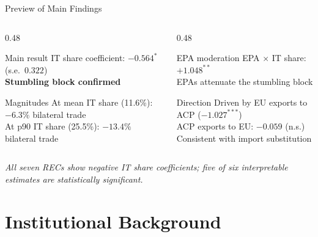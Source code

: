 \documentclass[aspectratio=169,11pt]{beamer}
\begin{document}
\begin{frame}{Preview of Main Findings}

    \begin{columns}[T]
        \begin{column}{0.48\textwidth}
            \begin{block}{Main result}
                IT share coefficient: \alert{$-0.564^{*}$} (s.e.\ $0.322$)\\[2pt]
                \textbf{Stumbling block confirmed}
            \end{block}
            \medskip
            \begin{block}{Magnitudes}
                At mean IT share (11.6\%): \alert{$-6.3\%$} bilateral trade\\
                At p90 IT share (25.5\%): \alert{$-13.4\%$} bilateral trade
            \end{block}
        \end{column}
        \begin{column}{0.48\textwidth}
            \begin{block}{EPA moderation}
                EPA $\times$ IT share: \alert{$+1.048^{**}$}\\
                EPAs attenuate the stumbling block
            \end{block}
            \medskip
            \begin{block}{Direction}
                Driven by \alert{EU exports to ACP} ($-1.027^{***}$)\\
                ACP exports to EU: $-0.059$ (n.s.)\\[2pt]
                \small Consistent with import substitution
            \end{block}
        \end{column}
    \end{columns}

    \bigskip
    \small\textit{All seven RECs show negative IT share coefficients;
    five of six interpretable estimates are statistically significant.}

\end{frame}

\section{Institutional Background}
\end{document}
